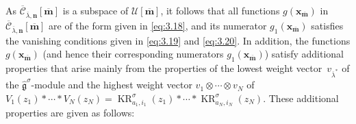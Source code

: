 \documentclass[pdftex]{sigma}
\numberwithin{equation}{section}
\DeclareMathOperator{\KR}{KR}
\begin{document}
As $\overline{\mathcal{C}}_{\overline{\lambda},\mathbf{n}}[\overline{\mathbf{m}}]$ is a subspace of $\mathcal{U}[\overline{\mathbf{m}}]$, it follows that all functions $g(\mathbf{x}_{\overline{\mathbf{m}}})$ in $\overline{\mathcal{C}}_{\overline{\lambda},\mathbf{n}}[\overline{\mathbf{m}}]$ are of the form given in \eqref{eq:3.18}, and its numerator $g_1(\mathbf{x}_{\overline{ \mathbf{m}}})$ satisfies the vanishing conditions given in \eqref{eq:3.19} and \eqref{eq:3.20}. In addition, the functions $g(\mathbf{x}_{\overline{\mathbf{m}}})$ (and hence their corresponding numerators $g_1(\mathbf{x}_{\overline{ \mathbf{m}}})$) satisfy additional properties that arise mainly from the properties of the lowest weight vector~$v_{\overline{\lambda}^*}$ of the $\widehat{\mathfrak{g}}^{ \sigma}$-module  and the highest weight vector $v_1\otimes\cdots\otimes v_N$ of $V_1(z_1)*\cdots*V_N(z_N)=\KR_{a_1,i_1}^{\sigma}(z_1)*\cdots* \KR_{a_N,i_N}^{\sigma}(z_N)$. These additional properties are given as follows:
\end{document}
